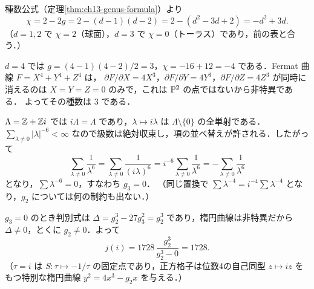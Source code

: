 種数公式（定理\ref{thm:ch13-genus-formula}）より
\begin{equation*}
  \chi = 2-2g = 2-(d-1)(d-2) = 2-(d^2-3d+2) = -d^2+3d .
\end{equation*}
（$d=1,2$ で $\chi=2$（球面），$d=3$ で $\chi=0$（トーラス）であり，前の表と合う．）

$d=4$ では $g=(4-1)(4-2)/2=3$，$\chi=-16+12=-4$ である．Fermat 曲線 $F=X^4+Y^4+Z^4$ は，
$\partial F/\partial X=4X^3$，$\partial F/\partial Y=4Y^3$，$\partial F/\partial Z=4Z^3$ が同時に消えるのは $X=Y=Z=0$ のみで，これは $\mathbb{P}^2$ の点ではないから非特異である．
よってその種数は $3$ である．

$\Lambda=\mathbb{Z}+\mathbb{Z} i$ では $i\Lambda=\Lambda$ であり，$\lambda\mapsto i\lambda$ は $\Lambda\setminus\{0\}$ の全単射である．
$\sum_{\lambda\neq0}|\lambda|^{-6}<\infty$ なので級数は絶対収束し，項の並べ替えが許される．したがって
\begin{equation*}
  \sum_{\lambda\neq0}\frac1{\lambda^6} = \sum_{\lambda\neq0}\frac1{(i\lambda)^6} = i^{-6}\sum_{\lambda\neq0}\frac1{\lambda^6} = -\sum_{\lambda\neq0}\frac1{\lambda^6}
\end{equation*}
となり，$\sum\lambda^{-6}=0$，すなわち $g_3=0$．
（同じ置換で $\sum\lambda^{-4}=i^{-4}\sum\lambda^{-4}$ となり，$g_2$ については何の制約も出ない．）

$g_3=0$ のとき判別式は $\Delta=g_2^3-27g_3^2=g_2^3$ であり，楕円曲線は非特異だから $\Delta\neq0$，とくに $g_2\neq0$．よって
\begin{equation*}
  j(i) = 1728\,\frac{g_2^3}{g_2^3-0} = 1728 .
\end{equation*}
（$\tau=i$ は $S:\tau\mapsto-1/\tau$ の固定点であり，正方格子は位数4の自己同型 $z\mapsto iz$ をもつ特別な楕円曲線 $y^2=4x^3-g_2x$ を与える．）

